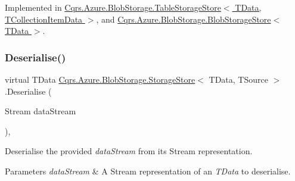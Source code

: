 Implemented in \hyperlink{classCqrs_1_1Azure_1_1BlobStorage_1_1TableStorageStore_ad504317a3b2c07172f50b8e7b8d0f78e_ad504317a3b2c07172f50b8e7b8d0f78e}{Cqrs.\+Azure.\+Blob\+Storage.\+Table\+Storage\+Store$<$ T\+Data, T\+Collection\+Item\+Data $>$}, and \hyperlink{classCqrs_1_1Azure_1_1BlobStorage_1_1BlobStorageStore_a68828f9e6c1f0d297623e5f0c9af0e7e_a68828f9e6c1f0d297623e5f0c9af0e7e}{Cqrs.\+Azure.\+Blob\+Storage.\+Blob\+Storage\+Store$<$ T\+Data $>$}.

\mbox{\label{classCqrs_1_1Azure_1_1BlobStorage_1_1StorageStore_a211bc47bff1108d10e319fee8b9769a0_a211bc47bff1108d10e319fee8b9769a0}} 
\subsubsection{\texorpdfstring{Deserialise()}{Deserialise()}\hspace{0.1cm}{\footnotesize\ttfamily [1/2]}}
{\footnotesize\ttfamily virtual T\+Data \hyperlink{classCqrs_1_1Azure_1_1BlobStorage_1_1StorageStore}{Cqrs.\+Azure.\+Blob\+Storage.\+Storage\+Store}$<$ T\+Data, T\+Source $>$.Deserialise (\begin{DoxyParamCaption}\item[{Stream}]{data\+Stream }\end{DoxyParamCaption})\hspace{0.3cm}{\ttfamily [protected]}, {\ttfamily [virtual]}}



Deserialise the provided {\itshape data\+Stream}  from its Stream representation. 


\begin{DoxyParams}{Parameters}
{\em data\+Stream} & A Stream representation of an {\itshape T\+Data}  to deserialise.\\
\hline
\end{DoxyParams}
\mbox{\label{classCqrs_1_1Azure_1_1BlobStorage_1_1StorageStore_adea25452991418693ed966797581f67f_adea25452991418693ed966797581f67f}} 
